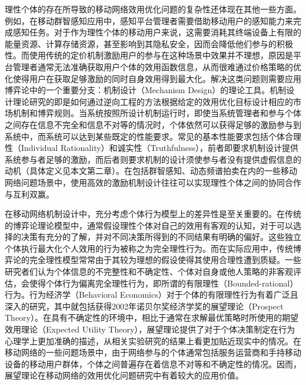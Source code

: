 理性个体的存在所导致的移动网络效用优化问题的复杂性还体现在其他一些方面。例如，在移动群智感知应用中，感知平台管理者需要借助移动用户的感知能力来完成感知任务。对于作为理性个体的移动用户来说，这需要消耗其终端设备上有限的能量资源、计算存储资源，甚至影响到其隐私安全，因而会降低他们参与的积极性。而使用传统的定价机制激励用户的参与在这种场景中效果并不理想，原因是平台管理者通常无法准确获取用户个体的效用函数信息，从而很难通过价格策略的优化使得用户在获取足够激励的同时自身效用得到最大化。解决这类问题则需要应用博弈论中的一个重要分支：机制设计（Mechanism Design）的理论工具\cite{Nisan07}。机制设计理论研究的即是如何通过逆向工程的方法根据给定的效用优化目标设计相应的市场机制和博弈规则。当系统按照所设计机制运行时，即使当系统管理者和参与个体之间存在信息不完全和信息不对等的情况时，个体依然可以获得足够的激励参与到系统中，而系统可以达到某些既定的性能要求。常见的基本性能要求包括个体合理性（Individual Rationality）和诚实性（Truthfulness），前者即要求机制设计提供系统参与者足够的激励，而后者则要求机制的设计须使参与者没有提供虚假信息的动机（具体定义见本文第二章）。在包括群智感知、动态频谱拍卖在内的一些移动网络问题场景中，使用高效的激励机制设计往往可以实现理性个体之间的协同合作与互利双赢。

在移动网络机制设计中，充分考虑个体行为模型上的差异性是至关重要的。在传统的博弈论理论模型中，通常假设理性个体对自己的效用有客观的认知，对于可以选择的决策有充分的了解，并对不同决策所得到的不同结果有明确的偏好。这些独立个体执行最大化个人效用的行为被称之为完全理性行为。而在实际应用中，传统博弈论的完全理性模型常常由于其较为理想的假设使得其使用合理性遭到质疑。一些研究者们认为个体信息的不完整性和不确定性、个体对自身或他人策略的非客观评估，会使得个体行为偏离完全理性行为，即所谓的有限理性（Bounded-rational）行为。行为经济学（Behavioral Economics）对于个体的有限理性行为有着广泛且深入的研究，其中就包括获得2002年诺贝尔奖经济学奖的展望理论（Prospect Theory）\cite{Kahneman}。在具有不确定性的环境中，相比于通常在求解最优策略时所使用的期望效用理论（Expected Utility Theory），展望理论提供了对于个体决策制定在行为心理学上更加准确的描述，从相关实验研究的结果上看更加贴近现实中的情况。在移动网络的一些问题场景中，由于网络参与的个体通常包括服务运营商和手持移动设备的移动用户群体，个体之间普遍存在着信息不对等和不确定性的情况。因而，展望理论在移动网络的效用优化问题研究中有着较大的应用价值。


